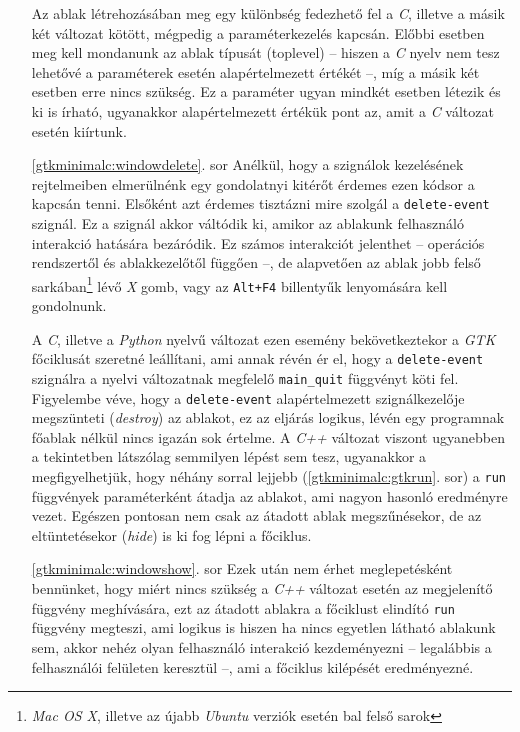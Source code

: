 \begin{enumerate}
Az ablak létrehozásában meg egy különbség fedezhető fel a \textit{C}, illetve a másik két változat kötött, mégpedig a paraméterkezelés kapcsán. Előbbi esetben meg kell mondanunk az ablak típusát (toplevel) -- hiszen a \textit{C} nyelv nem tesz lehetővé a paraméterek esetén alapértelmezett értékét --, míg a másik két esetben erre nincs szükség. Ez a paraméter ugyan mindkét esetben létezik és ki is írható, ugyanakkor alapértelmezett értékük pont az, amit a \textit{C} változat esetén kiírtunk.

 \item[\ref{gtkminimalc:windowdelete}. sor] Anélkül, hogy a szignálok kezelésének rejtelmeiben elmerülnénk egy gondolatnyi kitérőt érdemes ezen kódsor a kapcsán tenni. Elsőként azt érdemes tisztázni mire szolgál a \texttt{delete-event} szignál. Ez a szignál akkor váltódik ki, amikor az ablakunk felhasználó interakció hatására bezáródik. Ez számos interakciót jelenthet -- operációs rendszertől és ablakkezelőtől függően --, de alapvetően az ablak jobb felső sarkában\footnote{\textit{Mac OS X}, illetve az újabb \textit{Ubuntu} verziók esetén bal felső sarok} lévő \textit{X} gomb, vagy az \texttt{Alt+F4} billentyűk lenyomására kell gondolnunk.

A \textit{C}, illetve a \textit{Python} nyelvű változat ezen esemény bekövetkeztekor a \textit{GTK} főciklusát szeretné leállítani, ami annak révén ér el, hogy a \texttt{delete-event} szignálra a nyelvi változatnak megfelelő \texttt{main\_quit} függvényt köti fel. Figyelembe véve, hogy a \texttt{delete-event} alapértelmezett szignálkezelője megszünteti (\textit{destroy}) az ablakot, ez az eljárás logikus, lévén egy programnak főablak nélkül nincs igazán sok értelme. A \textit{C++} változat viszont ugyanebben a tekintetben látszólag semmilyen lépést sem tesz, ugyanakkor a megfigyelhetjük, hogy néhány sorral lejjebb (\ref{gtkminimalc:gtkrun}. sor) a \texttt{run} függvények paraméterként átadja az ablakot, ami nagyon hasonló eredményre vezet. Egészen pontosan nem csak az átadott ablak megszűnésekor, de az eltüntetésekor (\textit{hide}) is ki fog lépni a főciklus.

 \item[\ref{gtkminimalc:windowshow}. sor] Ezek után nem érhet meglepetésként bennünket, hogy miért nincs szükség a \textit{C++} változat esetén az megjelenítő függvény meghívására, ezt az átadott ablakra a főciklust elindító \texttt{run} függvény megteszi, ami logikus is hiszen ha nincs egyetlen látható ablakunk sem, akkor nehéz olyan felhasználó interakció kezdeményezni -- legalábbis a felhasználói felületen keresztül --, ami a főciklus kilépését eredményezné.


\end{enumerate}
